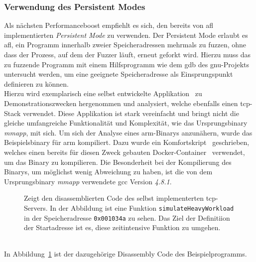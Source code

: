 \subsubsection{Verwendung des Persistent Modes}\label{subsubsec:persistent-mode}
Als nächsten Performanceboost empfiehlt es sich, den bereits von \gls{afl} implementierten \textit{Persistent Mode} zu verwenden.
Der Persistent Mode erlaubt es \gls{afl}, ein Programm innerhalb zweier Speicheradressen mehrmals zu fuzzen, ohne dass der Prozess,
auf dem der Fuzzer läuft, erneut geforkt wird.
Hierzu muss das zu fuzzende Programm mit einem Hilfsprogramm wie dem \gls{gdb} des \gls{gnu}-Projekts untersucht werden,
um eine geeignete Speicheradresse als Einsprungspunkt definieren zu können.\\
Hierzu wird exemplarisch eine selbst entwickelte Applikation~\cite{example-tcp-server} zu Demonstrationszwecken hergenommen
und analysiert, welche ebenfalls einen \gls{tcp}-Stack verwendet.
Diese Applikation ist stark vereinfacht und bringt nicht die gleiche umfangreiche Funktionalität und Komplexität, wie das Ursprungsbinary
\textit{mmapp}, mit sich.
Um sich der Analyse eines \gls{arm}-Binarys anzunähern, wurde das Beispielsbinary für \gls{arm} kompiliert.
Dazu wurde ein Komfortskript~\cite{compile-script} geschrieben, welches einen bereits für diesen Zweck gebauten Docker-Container~\cite{docker-gcc} verwendet, um
das Binary zu kompilieren.
Die Besonderheit bei der Kompilierung des Binarys, um möglichst wenig Abweichung zu haben, ist die von dem Ursprungsbinary
\textit{mmapp} verwendete \gls{gcc} Version \textit{4.8.1}.
\begin{figure}[h]
    \caption{Zeigt den disassemblierten Code des selbst implementerten \gls{tcp}-Servers.
    In der Abbildung ist eine Funktion \texttt{simulateHeavyWorkload} in der Speicheradresse \texttt{0x001034a} zu sehen.
    Das Ziel der Definitiion der Startadresse ist es, diese zeitintensive Funktion zu umgehen.}\label{fig:example-server-disassembly}
\end{figure}\\
In Abbildung~\ref{fig:example-server-disassembly} ist der dazugehörige Disassembly Code des Beispielprogramms.
